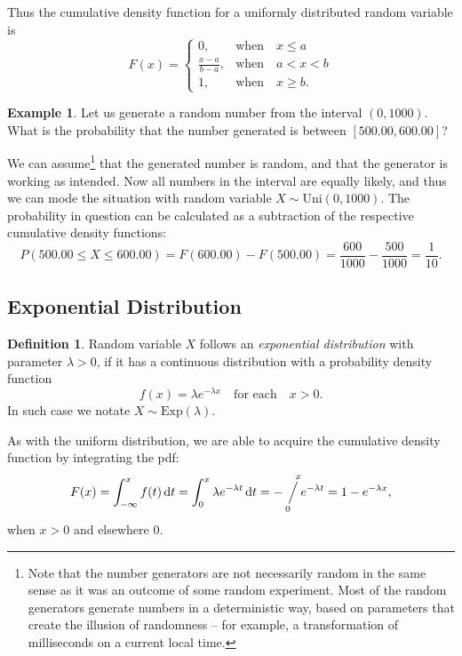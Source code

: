\documentclass[12pt,a4paper,leqno]{report}
\newcommand{\dif}{\,\mathrm{d}}
\newcommand{\sijoitus}[2]{\mathop{\Big/}\limits_{\hspace{-0.85em}{#1}}^{\hspace{0.85em}{#2}}\hspace{-0.2em}}
\theoremstyle{plain}
\theoremstyle{definition}
\newtheorem{maar}[equation]{Definition}
\newtheorem{esim}[equation]{Example}
\begin{document}
Thus the cumulative density function for a uniformly distributed random variable is
\[
F(x)= \begin{cases}
0, &\text{when} \quad x \leq a \\
\frac{x-a}{b-a}, &\text{when} \quad a < x < b \\
1, &\text{when} \quad  x\geq b. 
\end{cases} 
\]

\begin{esim}
Let us generate a random number from the interval $(0,1000)$. What is the probability that the number generated is between $[500.00,600.00]$?

We can assume\footnote{Note that the number generators are not necessarily random in the same sense as it was an outcome of some random experiment. Most of the random generators generate numbers in a deterministic way, based on parameters that create the illusion of randomness -- for example, a transformation of milliseconds on a current local time.} that the generated number is random, and that the generator is working as intended. Now all numbers in the interval are equally likely, and thus we can mode the situation with random variable $X\sim \text{Uni}(0,1000)$. The probability in question can be calculated as a subtraction of the respective cumulative density functions:
\[
P(500.00 \leq X \leq 600.00) = F(600.00) - F(500.00) = \frac{600}{1000} - \frac{500}{1000} = \frac{1}{10}.
\]
\end{esim}

\subsection{Exponential Distribution}\label{exponential_distr}

\begin{maar}
Random variable $X$ follows an \emph{exponential distribution}  with parameter $\lambda > 0$, if it has a continuous distribution with a probability density function 
\[
f(x) = \lambda e^{-\lambda x} \quad \text{for each} \quad x > 0.
\]
In such case we notate $X \sim \text{Exp}(\lambda)$.

As with the uniform distribution, we are able to acquire the cumulative density function by integrating the pdf:
\[
F(x) = \int_{-\infty}^x f(t)\dif t = \int_0^x \lambda e^{-\lambda t}\dif t = - \sijoitus{0}{x} e^{-\lambda t} = 1- e^{-\lambda x},
\]
when $x>0$ and elsewhere $0$.

\end{maar}
\end{document}

